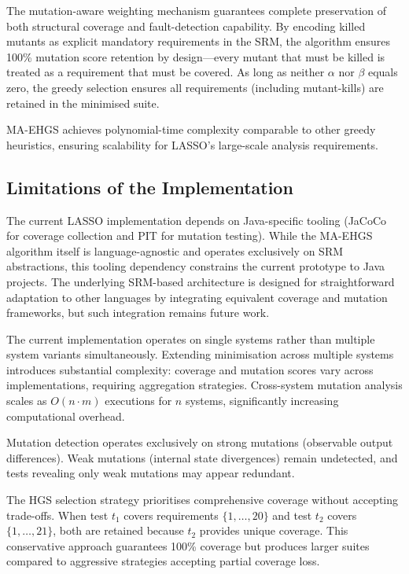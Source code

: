 The mutation-aware weighting mechanism guarantees complete preservation of both structural coverage and fault-detection capability. By encoding killed mutants as explicit mandatory requirements in the SRM, the algorithm ensures 100\% mutation score retention by design---every mutant that must be killed is treated as a requirement that must be covered. As long as neither $\alpha$ nor $\beta$ equals zero, the greedy selection ensures all requirements (including mutant-kills) are retained in the minimised suite.

MA-EHGS achieves polynomial-time complexity comparable to other greedy heuristics, ensuring scalability for LASSO's large-scale analysis requirements.


\subsection{Limitations of the Implementation}

The current LASSO implementation depends on Java-specific tooling (JaCoCo for coverage collection and PIT for mutation testing). While the MA-EHGS algorithm itself is language-agnostic and operates exclusively on SRM abstractions, this tooling dependency constrains the current prototype to Java projects. The underlying SRM-based architecture is designed for straightforward adaptation to other languages by integrating equivalent coverage and mutation frameworks, but such integration remains future work.

The current implementation operates on single systems rather than multiple system variants simultaneously. Extending minimisation across multiple systems introduces substantial complexity: coverage and mutation scores vary across implementations, requiring aggregation strategies. Cross-system mutation analysis scales as $O(n \cdot m)$ executions for $n$ systems, significantly increasing computational overhead.

Mutation detection operates exclusively on strong mutations (observable output differences). Weak mutations (internal state divergences) remain undetected, and tests revealing only weak mutations may appear redundant.

The HGS selection strategy prioritises comprehensive coverage without accepting trade-offs. When test $t_1$ covers requirements $\{1, \ldots, 20\}$ and test $t_2$ covers $\{1, \ldots, 21\}$, both are retained because $t_2$ provides unique coverage. This conservative approach guarantees 100\% coverage but produces larger suites compared to aggressive strategies accepting partial coverage loss.

